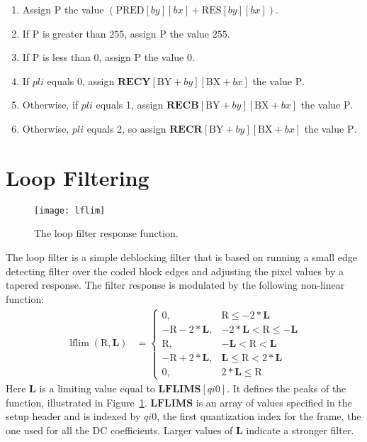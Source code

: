 \documentclass[9pt,letterpaper]{book}
\newcommand{\idx}[1]{{\ensuremath{\mathit{#1}}}}
\newcommand{\pli}{\idx{pli}}
\newcommand{\bitvar}[1]{\ensuremath{\mathbf{\bm{#1}}}}
\newcommand{\locvar}[1]{\ensuremath{\mathrm{#1}}}
\newcommand{\lflim}{\ensuremath{\mathop{\mathrm{lflim}}\nolimits}}
\numberwithin{equation}{chapter}
\numberwithin{figure}{chapter}
\numberwithin{table}{chapter}
\begin{document}
\begin{enumerate}
\begin{enumerate}
\begin{enumerate}
\item
Assign \locvar{P} the value
 $(\locvar{PRED}[\locvar{\idx{by}}][\locvar{\idx{bx}}]+
 \locvar{RES}[\locvar{\idx{by}}][\locvar{\idx{bx}}])$.
\item
If \locvar{P} is greater than $255$, assign \locvar{P} the value $255$.
\item
If \locvar{P} is less than $0$, assign \locvar{P} the value $0$.
\item
If \locvar{\pli} equals 0, assign
 $\bitvar{RECY}[\locvar{BY}+\locvar{\idx{by}}][\locvar{BX}+\locvar{\idx{bx}}]$
 the value \locvar{P}.
\item
Otherwise, if \locvar{\pli} equals 1, assign
 $\bitvar{RECB}[\locvar{BY}+\locvar{\idx{by}}][\locvar{BX}+\locvar{\idx{bx}}]$
 the value \locvar{P}.
\item
Otherwise, \locvar{\pli} equals 2, so assign
 $\bitvar{RECR}[\locvar{BY}+\locvar{\idx{by}}][\locvar{BX}+\locvar{\idx{bx}}]$
 the value \locvar{P}.
\end{enumerate}
\end{enumerate}
\end{enumerate}

\section{Loop Filtering}
\label{sec:loopfilter}

\begin{figure}[htbp]
\begin{center}
\texttt{[image: lflim]}
\end{center}
\caption{The loop filter response function.}
\label{fig:lflim}
\end{figure}

The loop filter is a simple deblocking filter that is based on running a small
 edge detecting filter over the coded block edges and adjusting the pixel
 values by a tapered response.
The filter response is modulated by the following non-linear function:
\begin{align*}
\lflim(\locvar{R},\bitvar{L})&=\left\{\begin{array}{ll}
0,                        & \locvar{R}\le-2*\bitvar{L} \\
-\locvar{R}-2*\bitvar{L}, & -2*\bitvar{L}<\locvar{R}\le-\bitvar{L} \\
\locvar{R},               & -\bitvar{L}<\locvar{R}<\bitvar{L} \\
-\locvar{R}+2*\bitvar{L}, & \bitvar{L}\le\locvar{R}<2*\bitvar{L} \\
0,                        & 2*\bitvar{L}\le\locvar{R}
\end{array}\right.
\end{align*}
Here \bitvar{L} is a limiting value equal to $\bitvar{LFLIMS}[\idx{qi0}]$.
It defines the peaks of the function, illustrated in Figure~\ref{fig:lflim}.
\bitvar{LFLIMS} is an array of values specified in the setup header and is
 indexed by \idx{qi0}, the first quantization index for the frame, the one used
 for all the DC coefficients.
Larger values of \bitvar{L} indicate a stronger filter.
\end{document}
